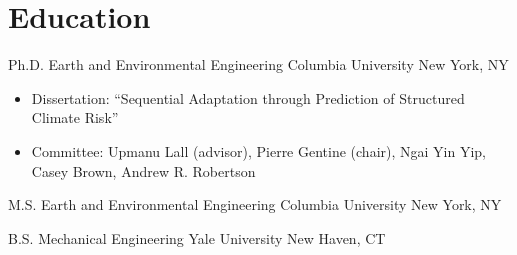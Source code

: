 \section{Education}

{Ph.D.}
{Earth and Environmental Engineering}
{Columbia University}
{New York, NY}
{
	\begin{itemize}
		\item Dissertation: ``Sequential Adaptation through Prediction of Structured Climate Risk''
		\item Committee: Upmanu Lall (advisor), Pierre Gentine (chair), Ngai Yin Yip, Casey Brown, Andrew R. Robertson
	\end{itemize}
}

{M.S.}
{Earth and Environmental Engineering}
{Columbia University}
{New York, NY}
{}

{B.S.}
{Mechanical Engineering}
{Yale University}
{New Haven, CT}
{}
